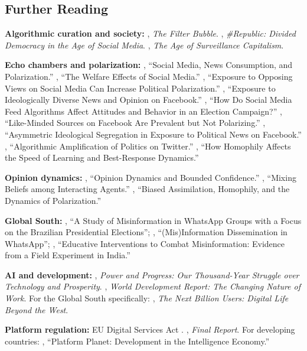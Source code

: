 \documentclass[../structural_economics_book.tex]{subfiles}
\begin{document}
\subsection*{Further Reading}

\textbf{Algorithmic curation and society:} \citet{pariser2011filter}, \textit{The Filter Bubble}. \citet{sunstein2017republic}, \textit{\#Republic: Divided Democracy in the Age of Social Media}. \citet{zuboff2019age}, \textit{The Age of Surveillance Capitalism}.

\textbf{Echo chambers and polarization:} \citet{levy2021social}, ``Social Media, News Consumption, and Polarization.'' \citet{allcott2020welfare}, ``The Welfare Effects of Social Media.'' \citet{bail2018exposure}, ``Exposure to Opposing Views on Social Media Can Increase Political Polarization.'' \citet{bakshy2015exposure}, ``Exposure to Ideologically Diverse News and Opinion on Facebook.'' \citet{guess2023how}, ``How Do Social Media Feed Algorithms Affect Attitudes and Behavior in an Election Campaign?'' \citet{nyhan2023like}, ``Like-Minded Sources on Facebook Are Prevalent but Not Polarizing.'' \citet{gonzalezbailon2023asymmetric}, ``Asymmetric Ideological Segregation in Exposure to Political News on Facebook.'' \citet{huszar2022algorithmic}, ``Algorithmic Amplification of Politics on Twitter.'' \citet{golub2012how}, ``How Homophily Affects the Speed of Learning and Best-Response Dynamics.''

\textbf{Opinion dynamics:} \citet{hegselmann2002opinion}, ``Opinion Dynamics and Bounded Confidence.'' \citet{deffuant2000mixing}, ``Mixing Beliefs among Interacting Agents.'' \citet{dandekar2013biased}, ``Biased Assimilation, Homophily, and the Dynamics of Polarization.''

\textbf{Global South:} \citet{machado2019study}, ``A Study of Misinformation in WhatsApp Groups with a Focus on the Brazilian Presidential Elections''; \citet{resende2019misinformation}, ``(Mis)Information Dissemination in WhatsApp''; \citet{badrinathan2021educative}, ``Educative Interventions to Combat Misinformation: Evidence from a Field Experiment in India.''

\textbf{AI and development:} \citet{acemoglu2023power}, \textit{Power and Progress: Our Thousand-Year Struggle over Technology and Prosperity}. \citet{worldbank2019world}, \textit{World Development Report: The Changing Nature of Work}. For the Global South specifically: \citet{arora2019next}, \textit{The Next Billion Users: Digital Life Beyond the West}.

\textbf{Platform regulation:} EU Digital Services Act \citep{eu2022regulation}. \citet{stigler2019final}, \textit{Final Report}. For developing countries: \citet{gurumurthy2019platform}, ``Platform Planet: Development in the Intelligence Economy.''
\end{document}
